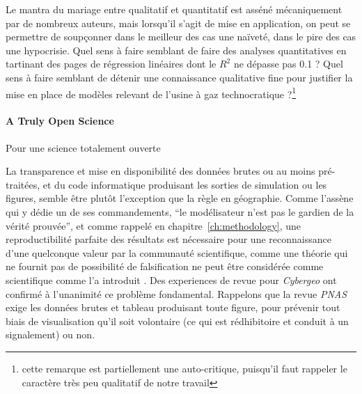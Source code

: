 Le mantra du mariage entre qualitatif et quantitatif est asséné mécaniquement par de nombreux auteurs, mais lorsqu'il s'agit de mise en application, on peut se permettre de soupçonner dans le meilleur des cas une naïveté, dans le pire des cas une hypocrisie. Quel sens à faire semblant de faire des analyses quantitatives en tartinant des pages de régression linéaires dont le $R^2$ ne dépasse pas 0.1 ? %
 Quel sens à faire semblant de détenir une connaissance qualitative fine pour justifier la mise en place de modèles relevant de l'usine à gaz technocratique ?\footnote{cette remarque est partiellement une auto-critique, puisqu'il faut rappeler le caractère très peu qualitatif de notre travail}

%



\paragraph{A Truly Open Science}{Pour une science totalement ouverte}



La transparence et mise en disponibilité des données brutes ou au moins pré-traitées, et du code informatique produisant les sorties de simulation ou les figures, semble être plutôt l'exception que la règle en géographie. Comme l'assène  qui y dédie un de ses commandements, ``le modélisateur n'est pas le gardien de la vérité prouvée'', et comme rappelé en chapitre~\ref{ch:methodology}, une reproductibilité parfaite des résultats est nécessaire pour une reconnaissance d'une quelconque valeur par la communauté scientifique, comme une théorie qui ne fournit pas de possibilité de falsification ne peut être considérée comme scientifique comme l'a introduit . Des experiences de revue pour \emph{Cybergeo} ont confirmé à l'unanimité ce problème fondamental. Rappelons que la revue \emph{PNAS} exige les données brutes et tableau produisant toute figure, pour prévenir tout biais de visualisation qu'il soit volontaire (ce qui est rédhibitoire et conduit à un signalement) ou non.


